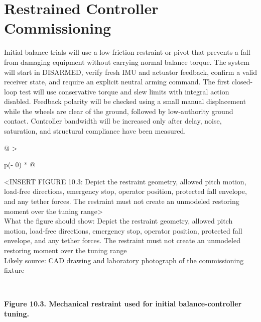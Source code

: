 \section{Restrained Controller Commissioning}\label{restrained-controller-commissioning}

Initial balance trials will use a low-friction restraint or pivot that
prevents a fall from damaging equipment without carrying normal balance
torque. The system will start in DISARMED, verify fresh IMU and actuator
feedback, confirm a valid receiver state, and require an explicit
neutral arming command. The first closed-loop test will use conservative
torque and slew limits with integral action disabled. Feedback polarity
will be checked using a small manual displacement while the wheels are
clear of the ground, followed by low-authority ground contact.
Controller bandwidth will be increased only after delay, noise,
saturation, and structural compliance have been measured.

\begin{longtable}[]{@{}
  >{\raggedright\arraybackslash}p{(\columnwidth - 0\tabcolsep) * }@{}}
\toprule\noalign{}
\begin{minipage}[b]{\linewidth}\raggedright
\textless INSERT FIGURE 10.3: Depict the restraint geometry, allowed
pitch motion, load-free directions, emergency stop, operator position,
protected fall envelope, and any tether forces. The restraint must not
create an unmodeled restoring moment over the tuning
range\textgreater{}\\
What the figure should show: Depict the restraint geometry, allowed
pitch motion, load-free directions, emergency stop, operator position,
protected fall envelope, and any tether forces. The restraint must not
create an unmodeled restoring moment over the tuning range\\
Likely source: CAD drawing and laboratory photograph of the
commissioning fixture\strut
\end{minipage} \\
\midrule\noalign{}
\endhead
\bottomrule\noalign{}
\endlastfoot
\end{longtable}

\begin{center}\singlespacing
{}
\textbf{Figure 10.3. Mechanical restraint used for initial balance-controller tuning.}
\end{center}

